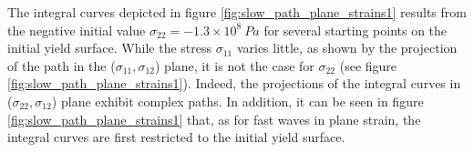 The integral curves depicted in figure \ref{fig:slow_path_plane_strains1} results from the negative initial value $\sigma_{22}=-1.3 \times 10^{8} \: Pa$ for several starting points on the initial yield surface.
While the stress $\sigma_{11}$ varies little, as shown by the projection of the path in the ($\sigma_{11},\sigma_{12}$) plane, it is not the case for $\sigma_{22}$ (see figure \ref{fig:slow_path_plane_strains1}).
Indeed, the projections of the integral curves in ($\sigma_{22},\sigma_{12}$) plane exhibit complex paths.
In addition, it can be seen in figure \ref{fig:slow_path_plane_strains1} that, as for fast waves in plane strain, the integral curves are first restricted to the initial yield surface.
